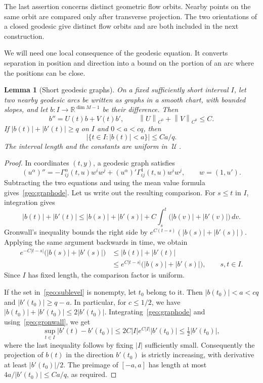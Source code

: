 \documentclass[10pt,oneside,reqno]{amsproc}
\numberwithin{equation}{section}
\newtheorem{lemma}[theorem]{Lemma}
\theoremstyle{definition}
\theoremstyle{remark}
\newcommand{\norm}[1]{\left\|#1\right\|}
\DeclareMathOperator{\cU}{{\mathscr U}}
\renewcommand{\ge}{\geqslant}
\renewcommand{\le}{\leqslant}
\begin{document}
The last assertion concerns distinct geometric flow orbits. Nearby points on the same orbit are compared only after transverse projection. The two orientations of a closed geodesic give distinct flow orbits and are both included in the next construction.

We will need one local consequence of the geodesic equation. It converts separation in position and direction into a bound on the portion of an arc where the positions can be close.

\begin{lemma}[Short geodesic graphs]
\label{geo:graphs}
On a fixed sufficiently short interval $I$, let two nearby geodesic arcs be written as graphs in a smooth chart, with bounded slopes, and let $b:I\to\mathbb R^{\dim M-1}$ be their difference. Then
\begin{equation}
 b''=U(t)b+V(t)b',\qquad \norm{U}_{C^0}+\norm{V}_{C^0}\le C.
 \label{geo:graphode}
\end{equation}
If $|b(t)|+|b'(t)|\ge q$ on $I$ and $0<a<cq$, then
\begin{equation}
 \bigl|\{t\in I:|b(t)|<a\}\bigr|\le Ca/q.
 \label{geo:sublevel}
\end{equation}
The interval length and the constants are uniform in $\cU$.
\end{lemma}

\begin{proof}
In coordinates $(t,y)$, a geodesic graph satisfies
\[
 (u^\alpha)''=-\Gamma^\alpha_{ij}(t,u)w^iw^j+(u^\alpha)'\Gamma^1_{ij}(t,u)w^iw^j,\qquad w=(1,u').
\]
Subtracting the two equations and using the mean value formula gives~\eqref{geo:graphode}. Let us write out the resulting comparison. For $s\le t$ in $I$, integration gives
\[
 |b(t)|+|b'(t)|\le |b(s)|+|b'(s)|+C\int_s^t\bigl(|b(v)|+|b'(v)|\bigr)\,dv.
\]
Gronwall's inequality bounds the right side by $e^{C(t-s)}(|b(s)|+|b'(s)|)$. Applying the same argument backwards in time, we obtain
\begin{equation}
 \begin{aligned}
 e^{-C|t-s|}\bigl(|b(s)|+|b'(s)|\bigr)
 &\le |b(t)|+|b'(t)|\\
 &\le e^{C|t-s|}\bigl(|b(s)|+|b'(s)|\bigr),\qquad s,t\in I.
 \end{aligned}
 \label{geo:gronwall}
\end{equation}
Since $I$ has fixed length, the comparison factor is uniform.

If the set in~\eqref{geo:sublevel} is nonempty, let $t_0$ belong to it. Then $|b(t_0)|<a<cq$ and $|b'(t_0)|\ge q-a$. In particular, for $c\le1/2$, we have $|b(t_0)|+|b'(t_0)|\le2|b'(t_0)|$. Integrating~\eqref{geo:graphode} and using~\eqref{geo:gronwall}, we get
\[
 \sup_{t\in I}|b'(t)-b'(t_0)|
 \le 2C|I|e^{C|I|}|b'(t_0)|
 \le\tfrac12|b'(t_0)|,
\]
where the last inequality follows by fixing $|I|$ sufficiently small.
Consequently the projection of $b(t)$ in the direction $b'(t_0)$ is strictly increasing, with derivative at least $|b'(t_0)|/2$. The preimage of $[-a,a]$ has length at most $4a/|b'(t_0)|\le Ca/q$, as required.
\end{proof}
\end{document}
